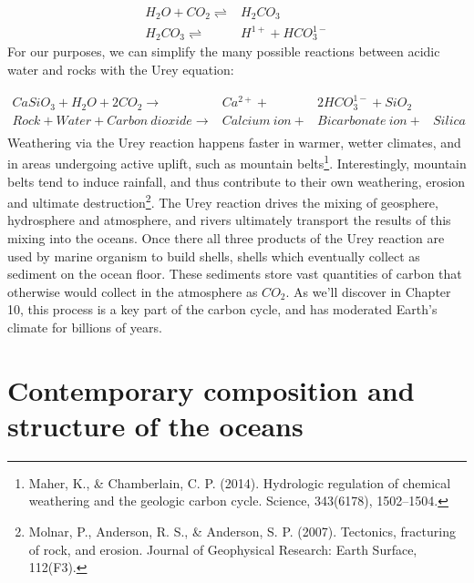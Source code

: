 \documentclass[amstex,12pt]{book}
\begin{document}
\begin{align} \label{eq:carbonic}
	H_2O+CO_2 \rightleftharpoons & H_2CO_3\\
	H_2CO_3  \rightleftharpoons & H^{1+} + HCO_3^{1-}
\end{align}
For our purposes, we can simplify the many possible reactions between acidic water and rocks with the Urey equation:

\begin{align} \label{eq:urey}
	CaSiO_3 + H_2O + 2CO_2  \rightarrow & Ca^{2+} + & 2HCO_3^{1-} + SiO_2\\
	Rock + Water + Carbon\ dioxide \rightarrow & Calcium\ ion + &  Bicarbonate\ ion  + & Silica \\
\end{align}
Weathering via the Urey reaction happens faster in warmer, wetter climates, and in areas undergoing active uplift, such as mountain belts\footnote{Maher, K., \& Chamberlain, C. P. (2014). Hydrologic regulation of chemical weathering and the geologic carbon cycle. Science, 343(6178), 1502–1504.}. Interestingly, mountain belts tend to induce rainfall, and thus contribute to their own weathering, erosion and ultimate destruction\footnote{Molnar, P., Anderson, R. S., \& Anderson, S. P. (2007). Tectonics, fracturing of rock, and erosion. Journal of Geophysical Research: Earth Surface, 112(F3).}.  The Urey reaction drives the mixing of geosphere, hydrosphere and atmosphere, and rivers ultimately transport the results of this mixing into the oceans. Once there all three products of the Urey reaction are used by marine organism to build shells, shells which eventually collect as sediment on the ocean floor. These sediments store vast quantities of carbon that otherwise would collect in the atmosphere as $CO_2$. As we'll discover in Chapter 10, this process is a key part of the carbon cycle, and has moderated Earth's climate for billions of years.

\section{Contemporary composition and structure of the oceans} \label{The Contemporary Ocean}
\end{document}
